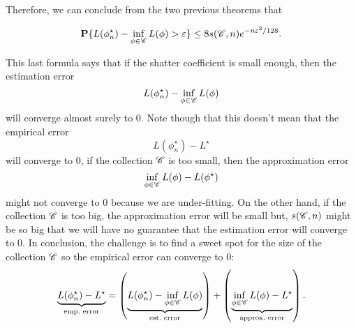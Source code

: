 Therefore, we can conclude from the two previous theorems that

\[ \mathbf{P}\{L(\phi_n^\star) - \inf_{\phi\in \mathscr{C}} L(\phi) > \varepsilon\} \leq  8 s(\mathscr{C},n) e^{-n\varepsilon^2/128}. \] 

This last formula says that if the shatter coefficient is small enough, then the estimation error
\[  L(\phi_n^\star) - \inf_{\phi\in\mathscr{C}} L(\phi) \] 
will converge almost surely to 0. Note though that this doesn't mean that the empirical error
\[ L(\phi_n^\star)- L^\star \] 
will converge to 0, if the collection $\mathscr{C}$ is too small, then the approximation error
\[ \inf_{\phi\in\mathscr{C}} L(\phi) - L(\phi^\star) \] 
might not converge to 0 because we are under-fitting. On the other hand, if the collection $\mathscr{C}$ is too big, the approximation error will be small but, $s(\mathscr{C}, n)$ might be so big that we will have no guarantee that the estimation error will converge to 0. In conclusion, the challenge is to find a sweet spot for the size of the collection $\mathscr{C}$ so the empirical error can converge to 0:
\[ \underbrace{L(\phi_n^\star)- L^\star}_{\text{emp.~error}} = \left(\underbrace{L(\phi_n^\star)- \inf_{\phi\in \mathscr{C}} L(\phi)}_{\text{est.~error}}\right) + \left(\underbrace{\inf_{\phi\in \mathscr{C}} L(\phi)- L^\star}_{\text{approx.~error}}\right). \] 
